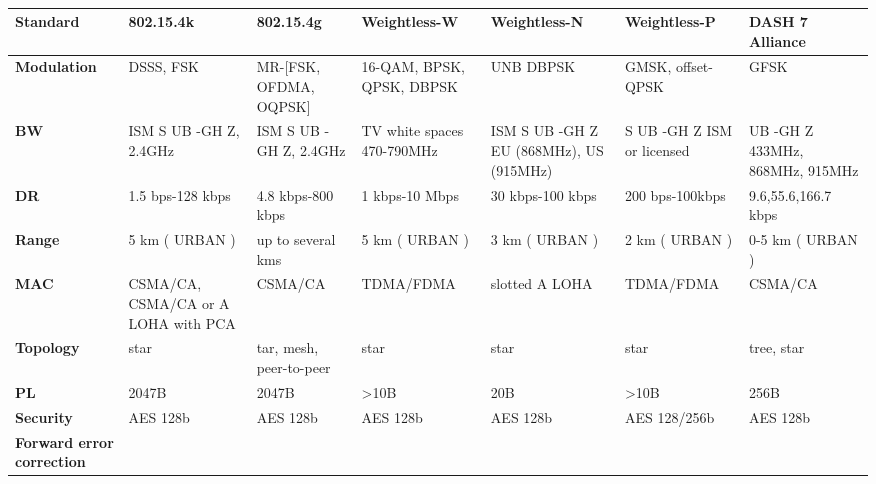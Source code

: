 \begin{table}[h!]
\scriptsize
	\begin{tabulary}{\columnwidth}{L|L|L|L|L|L|L}
	\textbf{Standard}                & \textbf{802.15.4k}                  & \textbf{802.15.4g}      & \textbf{Weightless-W}      & \textbf{Weightless-N}                   & \textbf{Weightless-P}      & \textbf{DASH 7 Alliance}\\\hline
	\textbf{Modulation}              & DSSS, FSK                           & MR-[FSK, OFDMA, OQPSK]  & 16-QAM, BPSK, QPSK, DBPSK  & UNB DBPSK                               & GMSK, offset-QPSK          & GFSK\\\hline
	\textbf{\ac{BW}}                    & ISM S UB -GH Z, 2.4GHz              & ISM S UB -GH Z, 2.4GHz  & TV white spaces 470-790MHz & ISM S UB -GH Z EU (868MHz), US (915MHz) & S UB -GH Z ISM or licensed & UB -GH Z 433MHz, 868MHz, 915MHz\\\hline
	\textbf{\ac{DR}}                 & 1.5 bps-128 kbps                    & 4.8 kbps-800 kbps       & 1 kbps-10 Mbps             & 30 kbps-100 kbps                        & 200 bps-100kbps            & 9.6,55.6,166.7 kbps\\\hline
	\textbf{Range}                   & 5 km ( URBAN )                      & up to several kms       & 5 km ( URBAN )             & 3 km ( URBAN )                          & 2 km ( URBAN )             & 0-5 km ( URBAN )\\\hline
	\textbf{MAC}                     & CSMA/CA, CSMA/CA or A LOHA with PCA & CSMA/CA                 & TDMA/FDMA                  & slotted A LOHA                          & TDMA/FDMA                  & CSMA/CA \\\hline
	\textbf{Topology}                & star                                & tar, mesh, peer-to-peer & star                       & star                                    & star                       & tree, star\\\hline
	\textbf{\ac{PL}}                 & 2047B                               & 2047B                   & >10B                       & 20B                                     & >10B                       & 256B \\\hline
	\textbf{Security}                & AES 128b                            & AES 128b                & AES 128b                   & AES 128b                                & AES 128/256b               & AES 128b \\\hline
	\textbf{Forward error correction}& \ok                                 & \ok                     & \ok                        & \ko                                     & \ok                        & \ok\\\hline
	\end{tabulary}
\caption{\label{tab:uyuy} \cite{raza_low_22}}
\end{table}

